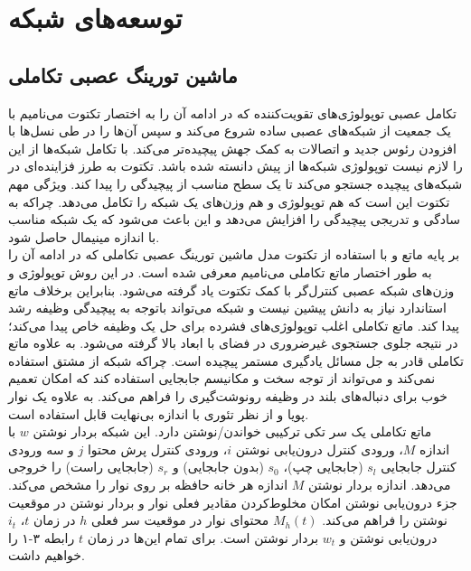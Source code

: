 \chapter{توسعه‌های شبکه}

\section{ماشین تورینگ عصبی تکاملی}
تکامل عصبی توپولوژی‌های تقویت‌کننده که در ادامه آن را به اختصار تکتوت می‌نامیم با یک جمعیت از شبکه‌های عصبی ساده شروع می‌کند و سپس آن‌ها را در طی نسل‌ها با افزودن رئوس جدید و اتصالات به کمک جهش پیچیده‌تر می‌کند. با تکامل شبکه‌ها از این را لازم نیست توپولوژی شبکه‌ها از پیش دانسته شده باشد. تکتوت به طرز فزاینده‌ای در شبکه‌های پیچیده جستجو می‌کند تا یک سطح مناسب از پیچیدگی را پیدا کند. ویژگی مهم تکتوت این است که هم توپولوژی و هم وزن‌های یک شبکه را تکامل می‌دهد. چراکه به سادگی و تدریجی پیچیدگی را افزایش می‌دهد و این باعث می‌شود که یک شبکه مناسب با اندازه مینیمال حاصل شود.\cite{merrild2018hyperntm}
\\

بر پایه ماتع و با استفاده از تکتوت مدل ماشین تورینگ عصبی تکاملی که در ادامه آن را به طور اختصار ماتع تکاملی می‌نامیم معرفی شده است. در این روش توپولوژی و وزن‌های شبکه عصبی کنترل‌گر با کمک تکتوت یاد گرفته می‌شود. بنابراین برخلاف ماتع استاندارد نیاز به دانش پیشین نیست و شبکه می‌تواند باتوجه به پیچیدگی وظیفه رشد پیدا کند. ماتع تکاملی اغلب توپولوژی‌‌های فشرده برای حل یک وظیفه خاص پیدا می‌کند؛ در نتیجه جلوی جستجوی غیرضروری در فضای با ابعاد بالا گرفته می‌شود. به علاوه ماتع تکاملی قادر به جل مسائل یادگیری مستمر پیچیده است. چراکه شبکه از مشتق استفاده نمی‌کند و می‌تواند از توجه سخت و مکانیسم جابجایی استفاده کند که امکان تعمیم خوب برای دنباله‌های بلند در وظیفه رونوشت‌گیری را فراهم می‌کند. به علاوه یک نوار پویا و از نظر تئوری با اندازه بی‌نهایت قابل استفاده است.\cite{merrild2018hyperntm}
\\

ماتع تکاملی یک سر تکی ترکیبی خواندن/نوشتن دارد. این شبکه بردار نوشتن $w$ با اندازه $M$، ورودی کنترل درون‌یابی نوشتن $i$، ورودی کنترل پرش محتوا $j$ و سه ورودی کنترل جابجایی $s_l$ (جابجایی چپ)، $s_0$ (بدون جابجایی) و $s_r$ (جابجایی راست) را خروجی می‌دهد. اندازه بردار نوشتن $M$ اندازه هر خانه حافظه بر روی نوار را مشخص می‌کند. جزء درون‌یابی نوشتن امکان مخلوط‌کردن مقادیر فعلی نوار و بردار نوشتن در موقعیت نوشتن را فراهم می‌کند. $M_h(t)$ محتوای نوار در موقعیت سر فعلی $h$ در زمان $t$، $i_t$ درون‌یابی نوشتن و $w_t$ بردار نوشتن است. برای تمام این‌ها در زمان $t$ رابطه ۳-۱ را خواهیم داشت.\cite{merrild2018hyperntm}


